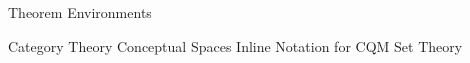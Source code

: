 
		
		
	\newcommand{\definition}[1]{\ensuremath{#1}\xspace}



	{Theorem Environments} %
	
	\newcommand{\emptyArg}{\,\underline{\hspace{6px}}\,} %
	\newcommand{\inlineQuote}[1]{\textquotedblleft #1\textquotedblright} %
	\newcommand{\TODO}{\textbf{[TODO]}} %
	\newcommand{\citeTODO}[1]{\textbf{[#1]}} %


	\newcommand{\iffdef}{\stackrel{def}{\iff}} %
	\newcommand{\iffdeftemp}{\stackrel{\Delta}{\iff}} %
	\newcommand{\eqdef}{:=} %
	\newcommand{\eqdeftemp}{\stackrel{\Delta}{=}} %
	\newcommand{\imply}{\Rightarrow} %

	\newcommand{\turnstyle}{\models} %



{Category Theory}
{Conceptual Spaces}
{Inline Notation for CQM}
{Set Theory}
